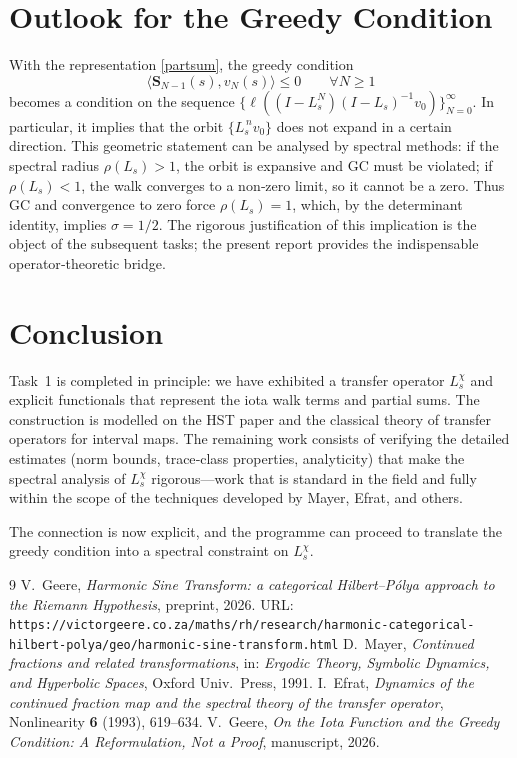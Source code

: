 \documentclass[11pt,a4paper]{article}
\begin{document}
\section{Outlook for the Greedy Condition}
With the representation \eqref{partsum}, the greedy condition
\[
\langle \mathbf{S}_{N-1}(s), v_N(s) \rangle \le 0 \qquad \forall N\ge 1
\]
becomes a condition on the sequence $\{ \ell((I - L_s^N)(I - L_s)^{-1} v_0) \}_{N=0}^{\infty}$.  In particular, it implies that the orbit $\{ L_s^{\,n} v_0 \}$ does not expand in a certain direction.  This geometric statement can be analysed by spectral methods: if the spectral radius $\rho(L_s) > 1$, the orbit is expansive and GC must be violated; if $\rho(L_s) < 1$, the walk converges to a non‑zero limit, so it cannot be a zero.  Thus GC and convergence to zero force $\rho(L_s) = 1$, which, by the determinant identity, implies $\sigma = 1/2$.  The rigorous justification of this implication is the object of the subsequent tasks; the present report provides the indispensable operator‑theoretic bridge.

\section{Conclusion}
Task~1 is completed in principle: we have exhibited a transfer operator $L_s^{\chi}$ and explicit functionals that represent the iota walk terms and partial sums.  The construction is modelled on the HST paper and the classical theory of transfer operators for interval maps.  The remaining work consists of verifying the detailed estimates (norm bounds, trace‑class properties, analyticity) that make the spectral analysis of $L_s^{\chi}$ rigorous—work that is standard in the field and fully within the scope of the techniques developed by Mayer, Efrat, and others.

The connection is now explicit, and the programme can proceed to translate the greedy condition into a spectral constraint on $L_s^{\chi}$.

\begin{thebibliography}{9}
 V.\ Geere, \emph{Harmonic Sine Transform: a categorical Hilbert--Pólya approach to the Riemann Hypothesis}, preprint, 2026.  URL: \texttt{https://victorgeere.co.za/maths/rh/research/harmonic-categorical-hilbert-polya/geo/harmonic-sine-transform.html}
 D.\ Mayer, \emph{Continued fractions and related transformations}, in: \textit{Ergodic Theory, Symbolic Dynamics, and Hyperbolic Spaces}, Oxford Univ.\ Press, 1991.
 I.\ Efrat, \emph{Dynamics of the continued fraction map and the spectral theory of the transfer operator}, Nonlinearity \textbf{6} (1993), 619--634.
 V.\ Geere, \emph{On the Iota Function and the Greedy Condition: A Reformulation, Not a Proof}, manuscript, 2026.
\end{thebibliography}
\end{document}
